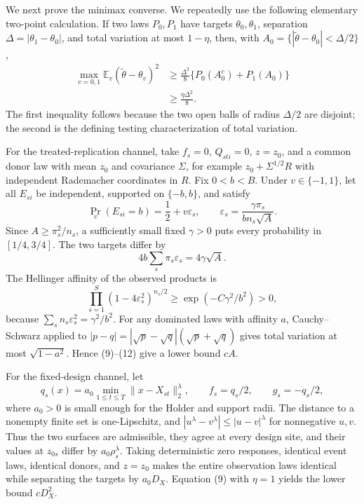 We next prove the minimax converse.  We repeatedly use the following elementary two-point calculation.  If two laws \(P_0,P_1\) have targets \(\theta_0,\theta_1\), separation \(\Delta=|\theta_1-\theta_0|\), and total variation at most \(1-\eta\), then, with \(A_0=\{|\widetilde\theta-\theta_0|<\Delta/2\}\),
\[
\begin{aligned}
 \max_{v=0,1}\mathbb E_v(\widetilde\theta-\theta_v)^2
 &\ge\frac{\Delta^2}{8}\{P_0(A_0^c)+P_1(A_0)\}\\
 &\ge\frac{\eta\Delta^2}{8}.
\end{aligned}                                               \tag{9}
\]
The first inequality follows because the two open balls of radius \(\Delta/2\) are disjoint; the second is the defining testing characterization of total variation.

For the treated-replication channel, take \(f_s=0\), \(Q_{sti}=0\), \(z=z_0\), and a common donor law with mean \(z_0\) and covariance \(\Sigma\), for example \(z_0+\Sigma^{1/2}R\) with independent Rademacher coordinates in \(R\).  Fix \(0<b<B\).  Under \(v\in\{-1,1\}\), let all \(E_{si}\) be independent, supported on \(\{-b,b\}\), and satisfy
\[
 \Pr_v(E_{si}=b)=\frac12+v\varepsilon_s,
 \qquad
 \varepsilon_s=\frac{\gamma\pi_s}{bn_s\sqrt A}.            \tag{10}
\]
Since \(A\ge\pi_s^2/n_s\), a sufficiently small fixed \(\gamma>0\) puts every probability in \([1/4,3/4]\).  The two targets differ by
\[
 4b\sum_s\pi_s\varepsilon_s=4\gamma\sqrt A.                \tag{11}
\]
The Hellinger affinity of the observed products is
\[
 \prod_{s=1}^{S}(1-4\varepsilon_s^2)^{n_s/2}
 \ge \exp(-C\gamma^2/b^2)>0,                                \tag{12}
\]
because \(\sum_sn_s\varepsilon_s^2=\gamma^2/b^2\).  For any dominated laws with affinity \(a\), Cauchy--Schwarz applied to
\(|p-q|=|\sqrt p-\sqrt q|(\sqrt p+\sqrt q)\) gives total variation at most \(\sqrt{1-a^2}\).  Hence (9)--(12) give a lower bound \(cA\).

For the fixed-design channel, let
\[
 q_s(x)=a_0\min_{1\le t\le T}\|x-X_{st}\|_2^\lambda,
 \qquad f_s=q_s/2,
 \qquad g_s=-q_s/2,                                         \tag{13}
\]
where \(a_0>0\) is small enough for the Holder and support radii.  The distance to a nonempty finite set is one-Lipschitz, and
\(|u^\lambda-v^\lambda|\le|u-v|^\lambda\) for nonnegative \(u,v\).  Thus the two surfaces are admissible, they agree at every design site, and their values at \(z_{0s}\) differ by \(a_0\rho_s^\lambda\).  Taking deterministic zero responses, identical event laws, identical donors, and \(z=z_0\) makes the entire observation laws identical while separating the targets by \(a_0D_X\).  Equation (9) with \(\eta=1\) yields the lower bound \(cD_X^2\).

